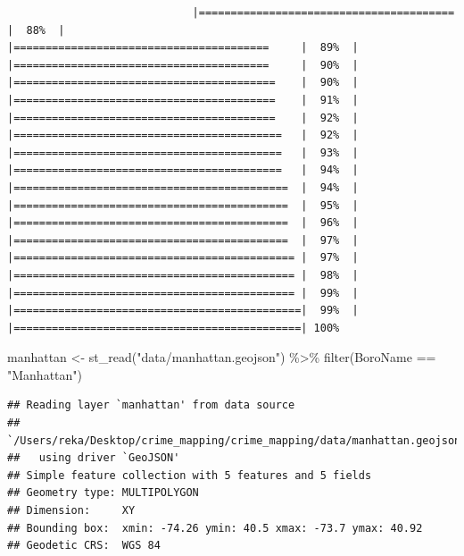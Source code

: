 \documentclass[
  krantz2]{krantz}
\makeatletter
\newenvironment{Shaded}{\begin{snugshade}}{\end{snugshade}}
\newcommand{\FunctionTok}[1]{\textcolor[rgb]{0,0,0}{#1}}
\newcommand{\NormalTok}[1]{#1}
\newcommand{\OtherTok}[1]{\textcolor[rgb]{0.37,0.37,0.37}{#1}}
\newcommand{\SpecialCharTok}[1]{\textcolor[rgb]{0,0,0}{#1}}
\newcommand{\StringTok}[1]{\textcolor[rgb]{0.5,0.5,0.5}{#1}}
\newenvironment{kframe}{%
\medskip{}
\setlength{\fboxsep}{.8em}
 \def\at@end@of@kframe{}%
 \ifinner\ifhmode%
  \def\at@end@of@kframe{\end{minipage}}%
  \begin{minipage}{\columnwidth}%
 \fi\fi%
 \def\FrameCommand##1{\hskip\@totalleftmargin \hskip-\fboxsep
 \colorbox{shadecolor}{##1}\hskip-\fboxsep
     \hskip-\linewidth \hskip-\@totalleftmargin \hskip\columnwidth}%
 \MakeFramed {\advance\hsize-\width
   \@totalleftmargin\z@ \linewidth\hsize
   \@setminipage}}%
 {\par\unskip\endMakeFramed%
 \at@end@of@kframe}
\renewenvironment{Shaded}{\begin{kframe}}{\end{kframe}}
\makeatother
\begin{document}
\begin{verbatim}
                             |========================================     |  88%  |                                                     |========================================     |  89%  |                                                     |========================================     |  90%  |                                                     |=========================================    |  90%  |                                                     |=========================================    |  91%  |                                                     |=========================================    |  92%  |                                                     |==========================================   |  92%  |                                                     |==========================================   |  93%  |                                                     |==========================================   |  94%  |                                                     |===========================================  |  94%  |                                                     |===========================================  |  95%  |                                                     |===========================================  |  96%  |                                                     |===========================================  |  97%  |                                                     |============================================ |  97%  |                                                     |============================================ |  98%  |                                                     |============================================ |  99%  |                                                     |=============================================|  99%  |                                                     |=============================================| 100%
\end{verbatim}

\begin{Shaded}
\begin{Highlighting}[]
\NormalTok{manhattan }\OtherTok{\textless{}{-}} \FunctionTok{st\_read}\NormalTok{(}\StringTok{"data/manhattan.geojson"}\NormalTok{) }\SpecialCharTok{\%\textgreater{}\%}
  \FunctionTok{filter}\NormalTok{(BoroName }\SpecialCharTok{==} \StringTok{"Manhattan"}\NormalTok{)}
\end{Highlighting}
\end{Shaded}

\begin{verbatim}
## Reading layer `manhattan' from data source 
##   `/Users/reka/Desktop/crime_mapping/crime_mapping/data/manhattan.geojson' 
##   using driver `GeoJSON'
## Simple feature collection with 5 features and 5 fields
## Geometry type: MULTIPOLYGON
## Dimension:     XY
## Bounding box:  xmin: -74.26 ymin: 40.5 xmax: -73.7 ymax: 40.92
## Geodetic CRS:  WGS 84
\end{verbatim}
\end{document}
